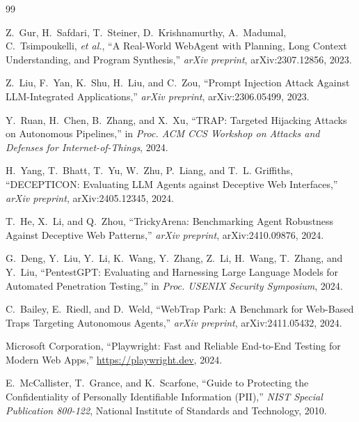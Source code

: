 \documentclass[12pt, a4paper, oneside]{report}
\begin{document}
\begin{thebibliography}{99}

Z.~Gur, H.~Safdari, T.~Steiner, D.~Krishnamurthy, A.~Madumal, C.~Tsimpoukelli, \textit{et al.},
``A Real-World WebAgent with Planning, Long Context Understanding, and Program Synthesis,''
\textit{arXiv preprint}, arXiv:2307.12856, 2023.

Z.~Liu, F.~Yan, K.~Shu, H.~Liu, and C.~Zou,
``Prompt Injection Attack Against LLM-Integrated Applications,''
\textit{arXiv preprint}, arXiv:2306.05499, 2023.

Y.~Ruan, H.~Chen, B.~Zhang, and X.~Xu,
``TRAP: Targeted Hijacking Attacks on Autonomous Pipelines,''
in \textit{Proc. ACM CCS Workshop on Attacks and Defenses for Internet-of-Things}, 2024.

H.~Yang, T.~Bhatt, T.~Yu, W.~Zhu, P.~Liang, and T.~L. Griffiths,
``DECEPTICON: Evaluating LLM Agents against Deceptive Web Interfaces,''
\textit{arXiv preprint}, arXiv:2405.12345, 2024.

T.~He, X.~Li, and Q.~Zhou,
``TrickyArena: Benchmarking Agent Robustness Against Deceptive Web Patterns,''
\textit{arXiv preprint}, arXiv:2410.09876, 2024.

G.~Deng, Y.~Liu, Y.~Li, K.~Wang, Y.~Zhang, Z.~Li, H.~Wang, T.~Zhang, and Y.~Liu,
``PentestGPT: Evaluating and Harnessing Large Language Models for Automated Penetration Testing,''
in \textit{Proc. USENIX Security Symposium}, 2024.

C.~Bailey, E.~Riedl, and D.~Weld,
``WebTrap Park: A Benchmark for Web-Based Traps Targeting Autonomous Agents,''
\textit{arXiv preprint}, arXiv:2411.05432, 2024.

Microsoft Corporation,
``Playwright: Fast and Reliable End-to-End Testing for Modern Web Apps,''
\url{https://playwright.dev}, 2024.

E.~McCallister, T.~Grance, and K.~Scarfone,
``Guide to Protecting the Confidentiality of Personally Identifiable Information (PII),''
\textit{NIST Special Publication 800-122}, National Institute of Standards and Technology, 2010.

\end{thebibliography}

\newpage
{}
\end{document}

